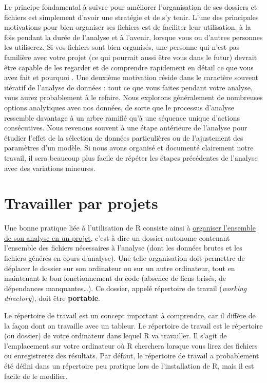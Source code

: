 \documentclass[
  french,
]{scrbook}
\begin{document}
Le principe fondamental à suivre pour améliorer l'organisation de ses dossiers et fichiers est simplement d'avoir une stratégie et de s'y tenir. L'une des principales motivations pour bien organiser ses fichiers est de faciliter leur utilisation, à la fois pendant la durée de l'analyse et à l'avenir, lorsque vous ou d'autres personnes les utiliserez. Si vos fichiers sont bien organisés, une personne qui n'est pas familière avec votre projet (ce qui pourrait aussi être vous dans le futur) devrait être capable de les regarder et de comprendre rapidement en détail ce que vous avez fait et pourquoi \autocite{noble2009}. Une deuxième motivation réside dans le caractère souvent itératif de l'analyse de données : tout ce que vous faites pendant votre analyse, vous aurez probablement à le refaire. Nous explorons généralement de nombreuses options analytiques avec nos données, de sorte que le processus d'analyse ressemble davantage à un arbre ramifié qu'à une séquence unique d'actions consécutives. Nous revenons souvent à une étape antérieure de l'analyse pour étudier l'effet de la sélection de données particulières ou de l'ajustement des paramètres d'un modèle. Si nous avons organisé et documenté clairement notre travail, il sera beaucoup plus facile de répéter les étapes précédentes de l'analyse avec des variations mineures.

\hypertarget{projets}{%
\section{Travailler par projets}\label{projets}}

Une bonne pratique liée à l'utilisation de R consiste ainsi à \href{https://rstats.wtf/project-oriented-workflow.html}{organiser l'ensemble de son analyse en un projet}, c'est à dire un dossier autonome contenant l'ensemble des fichiers nécessaires à l'analyse (dont les données brutes et les fichiers générés en cours d'analyse). Une telle organisation doit permettre de déplacer le dossier sur son ordinateur ou sur un autre ordinateur, tout en maintenant le bon fonctionnement du code (absence de liens brisés, de dépendances manquantes\ldots). Ce dossier, appelé répertoire de travail (\emph{working directory}), doit être \textbf{portable}.

Le répertoire de travail est un concept important à comprendre, car il diffère de la façon dont on travaille avec un tableur. Le répertoire de travail est le répertoire (ou dossier) de votre ordinateur dans lequel R va travailler. Il s'agit de l'emplacement sur votre ordinateur où R cherchera lorsque vous lirez des fichiers ou enregistrerez des résultats. Par défaut, le répertoire de travail a probablement été défini dans un répertoire peu pratique lors de l'installation de R, mais il est facile de le modifier.
\end{document}
